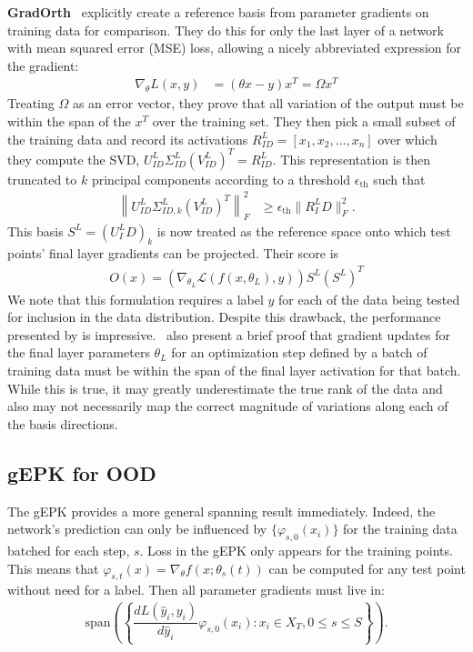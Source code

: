 \textbf{GradOrth}~\citet{behpour2023} explicitly create a reference basis from parameter gradients on training data for comparison. They do this for only the last layer of a network with mean squared error (MSE) loss, allowing a nicely abbreviated expression for the gradient:
\begin{align}
    \nabla_\theta L(x, y) &= (\theta x - y)x^T = \Omega x^T
\end{align}
Treating $\Omega$ as an error vector, they prove that all variation of the output must be within the span of the $x^T$ over the training set. They then pick a small subset of the training data and record its activations $R^L_{ID} = [x_1, x_2, ..., x_n]$ over which they compute the SVD, $U^L_{ID} \Sigma^L_{ID} (V^L_{ID})^T = R^L_{ID}$. This representation is then truncated to $k$ principal components according to a threshold $\epsilon_{\text{th}}$ such that 
\begin{align}
\left\| U^L_{ID} \Sigma^L_{ID, k} (V^L_{ID})^T\right\|^2_F &\geq \epsilon_\text{th} \|R^L_ID\|^2_F.
\end{align}
This basis $S^L = (U^L_ID)_k$ is now treated as the reference space onto which test points' final layer gradients can be projected. Their score is 
\begin{align}
    O(x) = (\nabla_{\theta_L} \mathcal{L}(f(x, \theta_L), y))S^L(S^L)^T
\end{align}
We note that this formulation requires a label $y$ for each of the data being tested for inclusion in the data distribution. Despite this drawback, the performance presented by \citet{behpour2023} is impressive.~\citet{behpour2023} also present a brief proof that gradient updates for the final layer parameters $\theta_L$ for an optimization step defined by a batch of training data must be within the span of the final layer activation for that batch. While this is true, it may greatly underestimate the true rank of the data and also may not necessarily map the correct magnitude of variations along each of the basis directions. 


\subsection{gEPK for OOD}
The gEPK provides a more general spanning result immediately. Indeed, the network's prediction can only be influenced by $\{\varphi_{s, 0}(x_i)\}$ for the training data batched for each step, $s$. 
Loss in the gEPK only appears for the training points. This means that $\varphi_{s, t}(x) = \nabla_\theta f(x; \theta_s(t))$ can be computed for any test point without need for a label. Then all parameter gradients must live in:
\begin{align}
\text{span}\left(\left\{\dfrac{dL(\hat y_i, y_i)}{d\hat y_i} \varphi_{s, 0}(x_i) : x_i \in X_T , 0 \leq s \leq S\right\} \right). 
\end{align}

